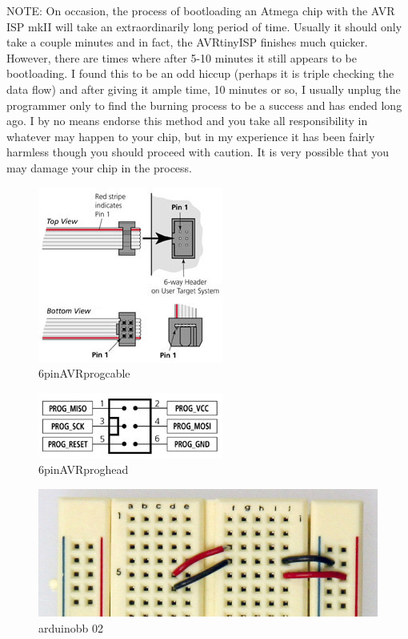 NOTE: On occasion, the process of bootloading an Atmega chip with the AVR ISP mkII will take an extraordinarily long period of time. Usually it should only take a couple minutes and in fact, the AVRtinyISP finishes much quicker. However, there are times where after 5-10 minutes it still appears to be bootloading. I found this to be an odd hiccup (perhaps it is triple checking the data flow) and after giving it ample time, 10 minutes or so, I usually unplug the programmer only to find the burning process to be a success and has ended long ago. I by no means endorse this method and you take all responsibility in whatever may happen to your chip, but in my experience it has been fairly harmless though you should proceed with caution. It is very possible that you may damage your chip in the process.

\begin{figure}[!htb]
 \centering
 \includegraphics[scale=0.3]{img/arduino_breadboard/6pinAVRprogcable.jpg}
 \caption{6pinAVRprogcable}
 \label{6pinAVRprogcable}
\end{figure}


\begin{figure}[!htb]
 \centering
 \includegraphics[scale=0.3]{img/arduino_breadboard/6pinAVRproghead.jpg}
 \caption{6pinAVRproghead}
 \label{6pinAVRproghead}
\end{figure}


\begin{figure}[!htb]
 \centering
 \includegraphics[scale=0.3]{img/arduino_breadboard/arduinobb_02.jpg}
 \caption{arduinobb 02}
 \label{arduinobb 02}
\end{figure}


